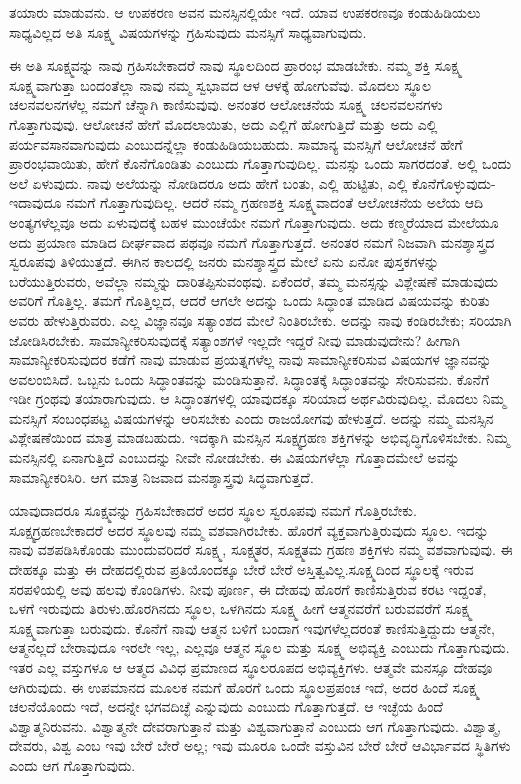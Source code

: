 ತಯಾರು ಮಾಡುವನು. ಆ ಉಪಕರಣ ಅವನ ಮನಸ್ಸಿನಲ್ಲಿಯೇ ಇದೆ. ಯಾವ ಉಪಕರಣವೂ ಕಂಡುಹಿಡಿಯಲು ಸಾಧ್ಯವಿಲ್ಲದ ಅತಿ ಸೂಕ್ಷ್ಮ ವಿಷಯಗಳನ್ನು ಗ್ರಹಿಸುವುದು ಮನಸ್ಸಿಗೆ ಸಾಧ್ಯವಾಗುವುದು.

ಈ ಅತಿ ಸೂಕ್ಷ್ಮವನ್ನು ನಾವು ಗ್ರಹಿಸಬೇಕಾದರೆ ನಾವು ಸ್ಥೂಲದಿಂದ ಪ್ರಾರಂಭ ಮಾಡಬೇಕು. ನಮ್ಮ ಶಕ್ತಿ ಸೂಕ್ಷ್ಮ ಸೂಕ್ಷ್ಮವಾಗುತ್ತಾ ಬಂದಂತೆಲ್ಲಾ ನಾವು ನಮ್ಮ ಸ್ವಭಾವದ ಆಳ ಆಳಕ್ಕೆ ಹೋಗುವೆವು. ಮೊದಲು ಸ್ಥೂಲ ಚಲನವಲನಗಳೆಲ್ಲ ನಮಗೆ ಚೆನ್ನಾಗಿ ಕಾಣಿಸುವುವು. ಅನಂತರ ಆಲೋಚನೆಯ ಸೂಕ್ಷ್ಮ ಚಲನವಲನಗಳು ಗೊತ್ತಾಗುವುವು. ಆಲೋಚನೆ ಹೇಗೆ ಮೊದಲಾಯಿತು, ಅದು ಎಲ್ಲಿಗೆ ಹೋಗುತ್ತಿದೆ ಮತ್ತು ಅದು ಎಲ್ಲಿ ಪರ್ಯವಸಾನವಾಗುವುದು ಎಂಬುದನ್ನೆಲ್ಲಾ ಕಂಡುಹಿಡಿಯಬಹುದು. ಸಾಮಾನ್ಯ ಮನಸ್ಸಿಗೆ ಆಲೋಚನೆ ಹೇಗೆ ಪ್ರಾರಂಭವಾಯಿತು, ಹೇಗೆ ಕೊನೆಗೊಂಡಿತು ಎಂಬುದು ಗೊತ್ತಾಗುವುದಿಲ್ಲ. ಮನಸ್ಸು ಒಂದು ಸಾಗರದಂತೆ. ಅಲ್ಲಿ ಒಂದು ಅಲೆ ಏಳುವುದು. ನಾವು ಅಲೆಯನ್ನು ನೋಡಿದರೂ ಅದು ಹೇಗೆ ಬಂತು, ಎಲ್ಲಿ ಹುಟ್ಟಿತು, ಎಲ್ಲಿ ಕೊನೆಗೊಳ್ಳುವುದು-ಇದಾವುದೂ ನಮಗೆ ಗೊತ್ತಾಗುವುದಿಲ್ಲ. ಆದರೆ ನಮ್ಮ ಗ್ರಹಣಶಕ್ತಿ ಸೂಕ್ಷ್ಮವಾದಂತೆ ಆಲೋಚನೆಯ ಅಲೆಯ ಆದಿ ಅಂತ್ಯಗಳೆಲ್ಲವೂ ಅದು ಏಳುವುದಕ್ಕೆ ಬಹಳ ಮುಂಚೆಯೇ ನಮಗೆ ಗೊತ್ತಾಗುವುದು. ಅದು ಕಣ್ಮರೆಯಾದ ಮೇಲೆಯೂ ಅದು ಪ್ರಯಾಣ ಮಾಡಿದ ದೀರ್ಘವಾದ ಪಥವೂ ನಮಗೆ ಗೊತ್ತಾಗುತ್ತದೆ. ಅನಂತರ ನಮಗೆ ನಿಜವಾಗಿ ಮನಶ್ಶಾಸ್ತ್ರದ ಸ್ವರೂಪವು ತಿಳಿಯುತ್ತದೆ. ಈಗಿನ ಕಾಲದಲ್ಲಿ ಜನರು ಮನಶ್ಶಾಸ್ತ್ರದ ಮೇಲೆ ಏನು ಏನೋ ಪುಸ್ತಕಗಳನ್ನು ಬರೆಯುತ್ತಿರುವರು, ಅವೆಲ್ಲಾ ನಮ್ಮನ್ನು ದಾರಿತಪ್ಪಿಸುವಂಥವು. ಏಕೆಂದರೆ, ತಮ್ಮ ಮನಸ್ಸನ್ನು ವಿಶ್ಲೇಷಣೆ ಮಾಡುವುದು ಅವರಿಗೆ ಗೊತ್ತಿಲ್ಲ. ತಮಗೆ ಗೊತ್ತಿಲ್ಲದ, ಆದರೆ ಆಗಲೇ ಅದನ್ನು ಒಂದು ಸಿದ್ಧಾಂತ ಮಾಡಿದ ವಿಷಯವನ್ನು ಕುರಿತು ಅವರು ಹೇಳುತ್ತಿರುವರು. ಎಲ್ಲ ವಿಜ್ಞಾನವೂ ಸತ್ಯಾಂಶದ ಮೇಲೆ ನಿಂತಿರಬೇಕು. ಅದನ್ನು ನಾವು ಕಂಡಿರಬೇಕು; ಸರಿಯಾಗಿ ಜೋಡಿಸಿರಬೇಕು. ಸಾಮಾನ್ಯೀಕರಿಸುವುದಕ್ಕೆ ಸತ್ಯಾಂಶಗಳೆ ಇಲ್ಲದೇ ಇದ್ದರೆ ನೀವು ಮಾಡುವುದೇನು? ಹೀಗಾಗಿ ಸಾಮಾನ್ಯೀಕರಿಸುವುದರ ಕಡೆಗೆ ನಾವು ಮಾಡುವ ಪ್ರಯತ್ನಗಳೆಲ್ಲ ನಾವು ಸಾಮಾನ್ಯೀಕರಿಸುವ ವಿಷಯಗಳ ಜ್ಞಾನವನ್ನು ಅವಲಂಬಿಸಿದೆ. ಒಬ್ಬನು ಒಂದು ಸಿದ್ಧಾಂತವನ್ನು ಮಂಡಿಸುತ್ತಾನೆ. ಸಿದ್ಧಾಂತಕ್ಕೆ ಸಿದ್ಧಾಂತವನ್ನು ಸೇರಿಸುವನು. ಕೊನೆಗೆ ಇಡೀ ಗ್ರಂಥವು ತಯಾರಾಗುವುದು. ಆ ಸಿದ್ಧಾಂತಗಳಲ್ಲಿ ಯಾವುದಕ್ಕೂ ಸರಿಯಾದ ಅರ್ಥವಿರುವುದಿಲ್ಲ. ಮೊದಲು ನಿಮ್ಮ ಮನಸ್ಸಿಗೆ ಸಂಬಂಧಪಟ್ಟ ವಿಷಯಗಳನ್ನು ಆರಿಸಬೇಕು ಎಂದು ರಾಜಯೋಗವು ಹೇಳುತ್ತದೆ. ಅದನ್ನು ನಮ್ಮ ಮನಸ್ಸಿನ ವಿಶ್ಲೇಷಣೆಯಿಂದ ಮಾತ್ರ ಮಾಡಬಹುದು. ಇದಕ್ಕಾಗಿ ಮನಸ್ಸಿನ ಸೂಕ್ಷ್ಮಗ್ರಹಣ ಶಕ್ತಿಗಳನ್ನು ಅಭಿವೃದ್ಧಿಗೊಳಿಸಬೇಕು. ನಿಮ್ಮ ಮನಸ್ಸಿನಲ್ಲಿ ಏನಾಗುತ್ತಿದೆ ಎಂಬುದನ್ನು ನೀವೇ ನೋಡಬೇಕು. ಈ ವಿಷಯಗಳೆಲ್ಲಾ ಗೊತ್ತಾದಮೇಲೆ ಅವನ್ನು ಸಾಮಾನ್ಯೀಕರಿಸಿರಿ. ಆಗ ಮಾತ್ರ ನಿಜವಾದ ಮನಶ್ಶಾಸ್ತ್ರವು ಸಿದ್ಧವಾಗುತ್ತದೆ.

ಯಾವುದಾದರೂ ಸೂಕ್ಷ್ಮವನ್ನು ಗ್ರಹಿಸಬೇಕಾದರೆ ಅದರ ಸ್ಥೂಲ ಸ್ವರೂಪವು ನಮಗೆ ಗೊತ್ತಿರಬೇಕು. ಸೂಕ್ಷ್ಮಗ್ರಹಣಬೇಕಾದರೆ ಅದರ ಸ್ಥೂಲವು ನಮ್ಮ ವಶವಾಗಿರಬೇಕು. ಹೊರಗೆ ವ್ಯಕ್ತವಾಗುತ್ತಿರುವುದು ಸ್ಥೂಲ. ಇದನ್ನು ನಾವು ವಶಪಡಿಸಿಕೊಂಡು ಮುಂದುವರಿದರೆ ಸೂಕ್ಷ್ಮ, ಸೂಕ್ಷ್ಮತರ, ಸೂಕ್ಷ್ಮತಮ ಗ್ರಹಣ ಶಕ್ತಿಗಳು ನಮ್ಮ ವಶವಾಗುವುವು. ಈ ದೇಹಕ್ಕೂ ಮತ್ತು ಈ ದೇಹದಲ್ಲಿರುವ ಪ್ರತಿಯೊಂದಕ್ಕೂ ಬೇರೆ ಬೇರೆ ಅಸ್ತಿತ್ವವಿಲ್ಲ.\break ಸೂಕ್ಷ್ಮದಿಂದ ಸ್ಥೂಲಕ್ಕೆ ಇರುವ ಸರಪಳಿಯಲ್ಲಿ ಅವು ಹಲವು ಕೊಂಡಿಗಳು. ನೀವು ಪೂರ್ಣ, ಈ ದೇಹವು ಹೊರಗೆ ಕಾಣಿಸುತ್ತಿರುವ ಕರಟ ಇದ್ದಂತೆ, ಒಳಗೆ ಇರುವುದು ತಿರುಳು.\break ಹೊರಗಿನದು ಸ್ಥೂಲ, ಒಳಗಿನದು ಸೂಕ್ಷ್ಮ ಹೀಗೆ ಆತ್ಮನವರೆಗೆ ಬರುವವರೆಗೆ ಸೂಕ್ಷ್ಮ ಸೂಕ್ಷ್ಮವಾಗುತ್ತಾ ಬರುವುದು. ಕೊನೆಗೆ ನಾವು ಆತ್ಮನ ಬಳಿಗೆ ಬಂದಾಗ ಇವುಗಳೆಲ್ಲದರಂತೆ ಕಾಣಿಸುತ್ತಿದ್ದುದು ಆತ್ಮನೇ, ಆತ್ಮನಲ್ಲದೆ ಬೇರಾವುದೂ ಇರಲೇ ಇಲ್ಲ, ಎಲ್ಲವೂ ಆತ್ಮನ ಸ್ಥೂಲ ಮತ್ತು ಸೂಕ್ಷ್ಮ ಅಭಿವ್ಯಕ್ತಿ ಎಂಬುದು ಗೊತ್ತಾಗುವುದು. ಇತರ ಎಲ್ಲ ವಸ್ತುಗಳೂ ಆ ಆತ್ಮದ ವಿವಿಧ ಪ್ರಮಾಣದ ಸ್ಥೂಲರೂಪದ ಅಭಿವ್ಯಕ್ತಿಗಳು. ಆತ್ಮವೇ ಮನಸ್ಸೂ ದೇಹವೂ ಆಗಿರುವುದು. ಈ ಉಪಮಾನದ ಮೂಲಕ ನಮಗೆ ಹೊರಗೆ ಒಂದು ಸ್ಥೂಲಪ್ರಪಂಚ ಇದೆ, ಅದರ ಹಿಂದೆ ಸೂಕ್ಷ್ಮ ಚಲನೆಯೊಂದು ಇದೆ, ಅದನ್ನೇ ಭಗವದಿಚ್ಛೆ ಎನ್ನುವುದು ಎಂಬುದು ಗೊತ್ತಾಗುತ್ತದೆ. ಆ ಇಚ್ಛೆಯ ಹಿಂದೆ ವಿಶ್ವಾತ್ಮನಿರುವನು. ವಿಶ್ವಾತ್ಮನೇ ದೇವರಾಗುತ್ತಾನೆ ಮತ್ತು ವಿಶ್ವವಾಗುತ್ತಾನೆ ಎಂಬುದು ಆಗ ಗೊತ್ತಾಗುವುದು. ವಿಶ್ವಾತ್ಮ, ದೇವರು, ವಿಶ್ವ ಎಂಬ ಇವು ಬೇರೆ ಬೇರೆ ಅಲ್ಲ; ಇವು ಮೂರೂ ಒಂದೇ ವಸ್ತುವಿನ ಬೇರೆ ಬೇರೆ ಆವಿರ್ಭಾವದ ಸ್ಥಿತಿಗಳು ಎಂದು ಆಗ ಗೊತ್ತಾಗುವುದು.

